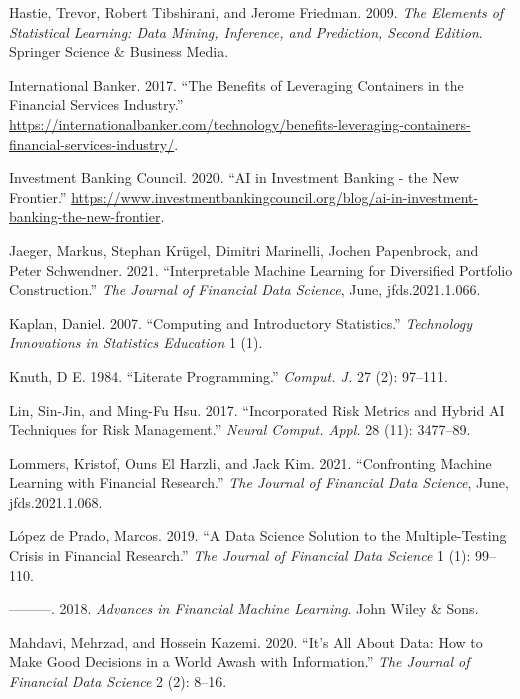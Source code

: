\documentclass{article}
\begin{document}
\leavevmode\hypertarget{ref-Hastie2009}{}%
Hastie, Trevor, Robert Tibshirani, and Jerome Friedman. 2009. \emph{The
Elements of Statistical Learning: Data Mining, Inference, and
Prediction, Second Edition}. Springer Science \& Business Media.

\leavevmode\hypertarget{ref-banker2017}{}%
International Banker. 2017. ``The Benefits of Leveraging Containers in
the Financial Services Industry.''
\url{https://internationalbanker.com/technology/benefits-leveraging-containers-financial-services-industry/}.

\leavevmode\hypertarget{ref-IBC2020}{}%
Investment Banking Council. 2020. ``AI in Investment Banking - the New
Frontier.''
\url{https://www.investmentbankingcouncil.org/blog/ai-in-investment-banking-the-new-frontier}.

\leavevmode\hypertarget{ref-Jaeger2021}{}%
Jaeger, Markus, Stephan Krügel, Dimitri Marinelli, Jochen Papenbrock,
and Peter Schwendner. 2021. ``Interpretable Machine Learning for
Diversified Portfolio Construction.'' \emph{The Journal of Financial
Data Science}, June, jfds.2021.1.066.

\leavevmode\hypertarget{ref-Kaplan2007}{}%
Kaplan, Daniel. 2007. ``Computing and Introductory Statistics.''
\emph{Technology Innovations in Statistics Education} 1 (1).

\leavevmode\hypertarget{ref-Knuth1984}{}%
Knuth, D E. 1984. ``Literate Programming.'' \emph{Comput. J.} 27 (2):
97--111.

\leavevmode\hypertarget{ref-Lin2017}{}%
Lin, Sin-Jin, and Ming-Fu Hsu. 2017. ``Incorporated Risk Metrics and
Hybrid AI Techniques for Risk Management.'' \emph{Neural Comput. Appl.}
28 (11): 3477--89.

\leavevmode\hypertarget{ref-Lommers2021}{}%
Lommers, Kristof, Ouns El Harzli, and Jack Kim. 2021. ``Confronting
Machine Learning with Financial Research.'' \emph{The Journal of
Financial Data Science}, June, jfds.2021.1.068.

\leavevmode\hypertarget{ref-De_Prado2019}{}%
López de Prado, Marcos. 2019. ``A Data Science Solution to the
Multiple-Testing Crisis in Financial Research.'' \emph{The Journal of
Financial Data Science} 1 (1): 99--110.

\leavevmode\hypertarget{ref-Lopez_de_Prado2018}{}%
---------. 2018. \emph{Advances in Financial Machine Learning}. John
Wiley \& Sons.

\leavevmode\hypertarget{ref-Mahdavi2020}{}%
Mahdavi, Mehrzad, and Hossein Kazemi. 2020. ``It's All About Data: How
to Make Good Decisions in a World Awash with Information.'' \emph{The
Journal of Financial Data Science} 2 (2): 8--16.
\end{document}
